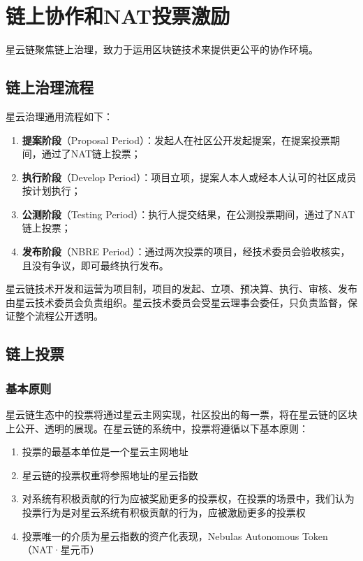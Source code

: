\section{链上协作和NAT投票激励}

星云链聚焦链上治理，致力于运用区块链技术来提供更公平的协作环境。

\subsection{链上治理流程}

星云治理通用流程如下：

\begin{enumerate}
\item \textbf{提案阶段}（Proposal Period）：发起人在社区公开发起提案，在提案投票期间，通过了NAT链上投票；
\item \textbf{执行阶段}（Develop Period）：项目立项，提案人本人或经本人认可的社区成员按计划执行；
\item \textbf{公测阶段}（Testing Period）：执行人提交结果，在公测投票期间，通过了NAT链上投票；
\item \textbf{发布阶段}（NBRE Period）：通过两次投票的项目，经技术委员会验收核实，且没有争议，即可最终执行发布。
\end{enumerate}

星云链技术开发和运营为项目制，项目的发起、立项、预决算、执行、审核、发布由星云技术委员会负责组织。星云技术委员会受星云理事会委任，只负责监督，保证整个流程公开透明。


\subsection{链上投票}
\subsubsection{基本原则}

星云链生态中的投票将通过星云主网实现，社区投出的每一票，将在星云链的区块上公开、透明的展现。在星云链的系统中，投票将遵循以下基本原则：
\begin{enumerate}
	\item 投票的最基本单位是一个星云主网地址
	\item 星云链的投票权重将参照地址的星云指数
	\item 对系统有积极贡献的行为应被奖励更多的投票权，在投票的场景中，我们认为投票行为是对星云系统有积极贡献的行为，应被激励更多的投票权
	\item 投票唯一的介质为星云指数的资产化表现，Nebulas Autonomous Token （NAT·星元币）
\end{enumerate}

